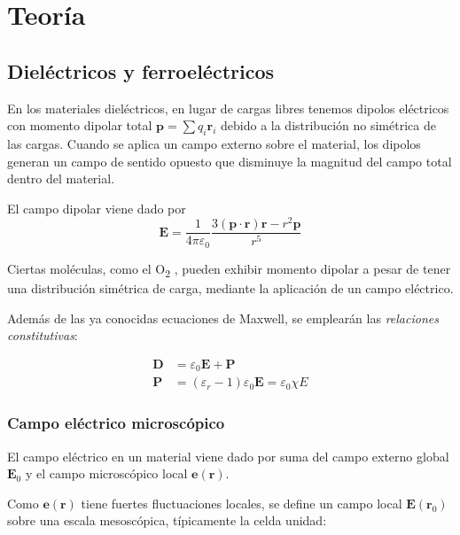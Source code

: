 \documentclass{tufte-book}
\begin{document}
%
%
%

\part{Teoría}
\chapter{Dieléctricos y ferroeléctricos}

En los materiales dieléctricos, en lugar de cargas libres tenemos dipolos
eléctricos con momento dipolar total $\symbf{p}=\sum q_i\symbf{r}_i$ debido a
la distribución no simétrica de las cargas. Cuando se aplica un campo externo
sobre el material, los dipolos generan un campo de sentido opuesto que
disminuye la magnitud del campo total dentro del material.

El campo dipolar viene dado por
\begin{equation}
   \symbf{E} = \frac{1}{4πε_0}\frac{3(\symbf{p}
    \cdot\symbf{r})\symbf{r}-r^2\symbf{p}}{r^5}
\end{equation}

Ciertas moléculas, como el O\textsubscript{2} , pueden exhibir momento dipolar
a pesar de tener una distribución simétrica de carga, mediante la aplicación de
un campo eléctrico.

Además de las ya conocidas ecuaciones de Maxwell, se emplearán las
\emph{relaciones constitutivas}:

\begin{align}
   \symbf{D} &= ε_0\symbf{E} +\symbf{P} \\
   \symbf{P} &= (ε_r-1)ε_0\symbf{E} = ε_0 χ E
\end{align}


\section{Campo eléctrico microscópico}
El campo eléctrico en un material viene dado por suma del campo
externo global $\symbf{E}_0$ y el campo microscópico local
$\symbf{e}(\symbf{r})$.

Como $\symbf{e}(\symbf{r})$ tiene fuertes fluctuaciones locales, se define un
campo local $\symbf{E}(\symbf{r}_0)$ sobre una escala mesoscópica,
típicamente la celda unidad:
\end{document}
